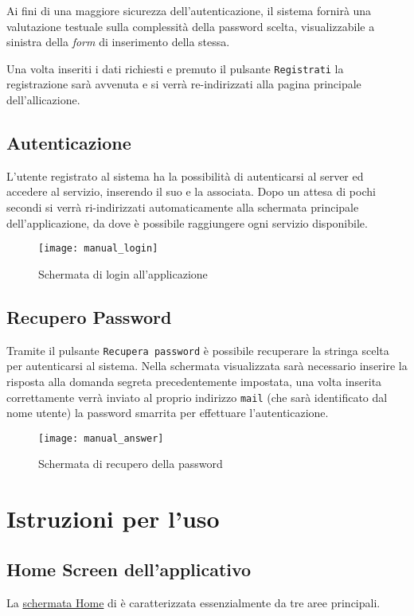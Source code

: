 Ai fini di una maggiore sicurezza dell'autenticazione, il sistema fornirà una valutazione testuale sulla complessità della password scelta, visualizzabile a sinistra della \textit{form} di inserimento della stessa.

Una volta inseriti i dati richiesti e premuto il pulsante \texttt{Registrati} la registrazione sarà avvenuta e si verrà re-indirizzati alla pagina principale dell'allicazione.

\subsection{Autenticazione}
L'utente registrato al sistema ha la possibilità di autenticarsi al server \caName{} ed accedere al servizio, inserendo il suo  e la  associata.
Dopo un attesa di pochi secondi si verrà ri-indirizzati automaticamente alla schermata principale dell'applicazione, da dove è possibile raggiungere ogni servizio disponibile.

\begin{figure}[H]
  \centering
  \texttt{[image: manual\_login]}
\caption{Schermata di login all'applicazione}\label{fig:login}
\end{figure}

\subsection{Recupero Password}
Tramite il pulsante \texttt{Recupera password} è possibile recuperare la stringa scelta per autenticarsi al sistema. Nella schermata visualizzata sarà necessario inserire la risposta alla domanda segreta precedentemente impostata, una volta inserita correttamente verrà inviato al proprio indirizzo \texttt{mail} (che sarà identificato dal nome utente) la password smarrita per effettuare l'autenticazione.

\begin{figure}[H]
  \centering
  \texttt{[image: manual\_answer]}
\caption{Schermata di recupero della password}\label{fig:answer}
\end{figure}


\section{Istruzioni per l'uso}
\subsection{Home Screen dell'applicativo }
La \underline{schermata Home} di \caName{} è caratterizzata essenzialmente da tre aree principali.

